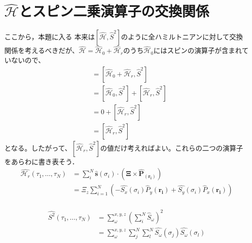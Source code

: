 \documentclass{article}
\begin{document}
\section{$\hat{\mathcal{H}}$とスピン二乗演算子の交換関係}
ここから，本題に入る
本来は$[\hat{\mathcal{H}}, \hat{S}^2]$のように全ハミルトニアンに対して交換関係を考えるべきだが、$\hat{\mathcal{H}}=\hat{\mathcal{H}}_0+\hat{\mathcal{H}}_r$のうち$\hat{\mathcal{H}}_0$にはスピンの演算子が含まれていないので、
\begin{align}
[\hat{\mathcal{H}}, \hat{S}^2]
    &=[\hat{\mathcal{H}}_0+\hat{\mathcal{H}}_r, \hat{S}^2]
    \nonumber\\
    &=[\hat{\mathcal{H}}_0, \hat{S}^2]+[\hat{\mathcal{H}}_r, \hat{S}^2]
    \nonumber\\
    &=0+[\hat{\mathcal{H}}_r, \hat{S}^2]
    \nonumber\\
    &=[\hat{\mathcal{H}}_r, \hat{S}^2]
\end{align}
となる。したがって、$[\hat{\mathcal{H}}_r, \hat{S}^2]$の値だけ考えればよい。これらの二つの演算子をあらわに書き表そう．
\begin{equation}
\begin{split}
\label{}
\hat{\mathcal{H}_r}(\tau_1,\dots,\tau_N)&=\sum_{i}^{N} \hat{\boldsymbol{s}}{(\sigma_i)} \cdot \left(\boldsymbol{\Xi} \times \hat{\boldsymbol{P}}_{(\boldsymbol{r_i})}\right)\\
&= \Xi_z \sum_{i=1}^{N} \left( -{\hat{S_x}}(\sigma_i) {\hat{P}_y}{(\boldsymbol{r_i})} + {\hat{S_y}}(\sigma_i) {\hat{P}_x}{(\boldsymbol{r_i})} \right)\\
\end{split}
\end{equation}


\begin{equation}
\begin{split}
\label{}
\hat{S^2}(\tau_1,\dots,\tau_N)&=\sum_{\omega}^{x,y,z}\left(\sum_{i}^{N} \hat{S}_{\omega}\right)^2\\
 &=\sum_{\omega}^{x,y,z}\sum_{j}^{N}\sum_{l}^{N}  \hat{S_{\omega}}{(\sigma_j)} \hat{S_{\omega}}{(\sigma_l)}\\
\end{split}
\end{equation}
\end{document}
